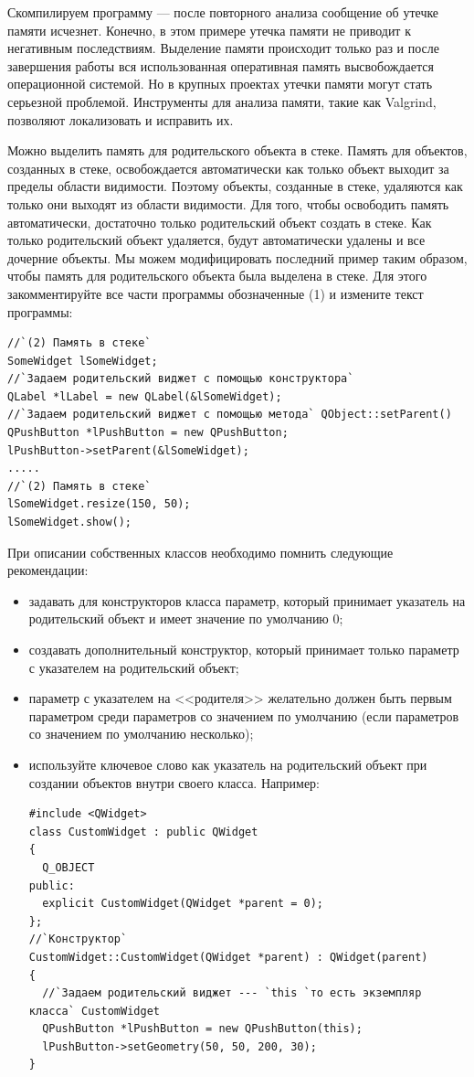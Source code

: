 Скомпилируем программу --- после повторного анализа сообщение об утечке памяти исчезнет. Конечно, в этом примере утечка
памяти не приводит к негативным последствиям. Выделение памяти происходит только раз и после завершения работы вся
использованная оперативная память высвобождается операционной системой. Но в крупных проектах утечки памяти могут стать
серьезной проблемой. Инструменты для анализа памяти, такие как Valgrind, позволяют локализовать и исправить их.

Можно выделить память для родительского объекта в стеке. Память для объектов, созданных в стеке, освобождается
автоматически как только объект выходит за пределы области видимости. Поэтому объекты, созданные в стеке, удаляются как
только они выходят из области видимости. Для того, чтобы освободить память автоматически, достаточно только
родительский объект создать в стеке. Как только родительский объект удаляется, будут автоматически удалены и все
дочерние объекты. Мы можем модифицировать последний пример таким образом, чтобы память для родительского объекта была
выделена в стеке. Для этого закомментируйте все части программы обозначенные (1) и измените текст
программы:
\begin{lstlisting}
//`(2) Память в стеке`
SomeWidget lSomeWidget;
//`Задаем родительский виджет с помощью конструктора`
QLabel *lLabel = new QLabel(&lSomeWidget);
//`Задаем родительский виджет с помощью метода` QObject::setParent()
QPushButton *lPushButton = new QPushButton;
lPushButton->setParent(&lSomeWidget);
.....
//`(2) Память в стеке`
lSomeWidget.resize(150, 50);
lSomeWidget.show();
\end{lstlisting}

При описании собственных классов необходимо помнить следующие рекомендации:

\begin{itemize}
\item задавать для конструкторов класса параметр, который принимает указатель на родительский объект и имеет значение по
умолчанию 0;
\item создавать дополнительный конструктор, который принимает только параметр с указателем на родительский объект;
\item параметр с указателем на <<родителя>> желательно должен быть первым параметром среди параметров со
значением по умолчанию (если параметров со значением по умолчанию несколько);
\item используйте ключевое слово  как указатель на родительский объект при создании объектов внутри своего
класса. Например:
\begin{lstlisting}
#include <QWidget>
class CustomWidget : public QWidget
{
  Q_OBJECT
public:
  explicit CustomWidget(QWidget *parent = 0);
};
//`Конструктор`
CustomWidget::CustomWidget(QWidget *parent) : QWidget(parent)
{
  //`Задаем родительский виджет --- `this `то есть экземпляр класса` CustomWidget
  QPushButton *lPushButton = new QPushButton(this); 
  lPushButton->setGeometry(50, 50, 200, 30);
}
\end{lstlisting}
\end{itemize}

